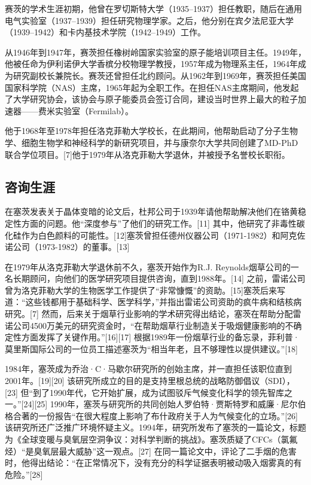 赛茨的学术生涯初期，他曾在罗切斯特大学（1935–1937）担任教职，随后在通用电气实验室（1937–1939）担任研究物理学家。之后，他分别在宾夕法尼亚大学（1939–1942）和卡内基技术学院（1942–1949）工作。

从1946年到1947年，赛茨担任橡树岭国家实验室的原子能培训项目主任。1949年，他被任命为伊利诺伊大学香槟分校物理学教授，1957年成为物理系主任，1964年成为研究副校长兼院长。赛茨还曾担任北约顾问。从1962年到1969年，赛茨担任美国国家科学院（NAS）主席，1965年起为全职工作。在担任NAS主席期间，他发起了大学研究协会，该协会与原子能委员会签订合同，建设当时世界上最大的粒子加速器——费米实验室（Fermilab）。

他于1968年至1978年担任洛克菲勒大学校长，在此期间，他帮助启动了分子生物学、细胞生物学和神经科学的新研究项目，并与康奈尔大学共同创建了MD-PhD联合学位项目。[7]他于1979年从洛克菲勒大学退休，并被授予名誉校长职衔。
\subsection{咨询生涯}  
在塞茨发表关于晶体变暗的论文后，杜邦公司于1939年请他帮助解决他们在铬黄稳定性方面的问题。他“深度参与”了他们的研究工作。[11] 其中，他研究了非毒性碳化硅作为白色颜料的可能性。[12]塞茨曾担任德州仪器公司（1971-1982）和阿克佐诺公司（1973-1982）的董事。[13]

在1979年从洛克菲勒大学退休前不久，塞茨开始作为R.J. Reynolds烟草公司的一名长期顾问，向他们的医学研究项目提供咨询，直到1988年。[14] 之前，雷诺公司曾为洛克菲勒大学的生物医学工作提供了“非常慷慨”的资助。[15]塞茨后来写道：“这些钱都用于基础科学、医学科学，”并指出雷诺公司资助的疯牛病和结核病研究。[7] 然而，后来关于烟草行业影响的学术研究得出结论，塞茨在帮助分配雷诺公司4500万美元的研究资金时，“在帮助烟草行业制造关于吸烟健康影响的不确定性方面发挥了关键作用。”[16][17] 根据1989年一份烟草行业的备忘录，菲利普·莫里斯国际公司的一位员工描述塞茨为“相当年老，且不够理性以提供建议。”[18]

1984年，塞茨成为乔治·C·马歇尔研究所的创始主席，并一直担任该职位直到2001年。[19][20] 该研究所成立的目的是支持里根总统的战略防御倡议（SDI），[23] 但“到了1990年代，它开始扩展，成为试图驳斥气候变化科学的领先智库之一。”[24][25] 1990年，塞茨与研究所的共同创始人罗伯特·贾斯特罗和威廉·尼尔伯格合著的一份报告“在很大程度上影响了布什政府关于人为气候变化的立场。”[26] 该研究所还广泛推广环境怀疑主义。1994年，研究所发布了塞茨的一篇论文，标题为《全球变暖与臭氧层空洞争议：对科学判断的挑战》。塞茨质疑了CFCs（氯氟烃）“是臭氧层最大威胁”这一观点。[27] 在同一篇论文中，评论了二手烟的危害时，他得出结论：“在正常情况下，没有充分的科学证据表明被动吸入烟雾真的有危险。”[28]

